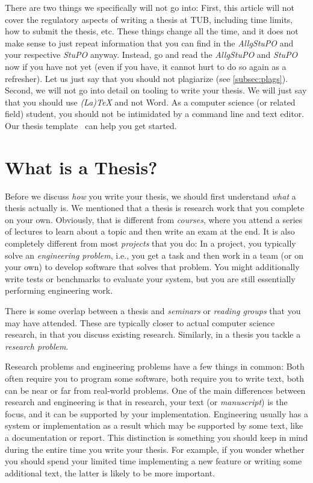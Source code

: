 \documentclass[a4paper]{article}
\begin{document}
There are two things we specifically will not go into:
First, this article will not cover the regulatory aspects of writing a thesis at TUB, including time limits, how to submit the thesis, etc.
These things change all the time, and it does not make sense to just repeat information that you can find in the \emph{AllgStuPO} and your respective \emph{StuPO} anyway.
Instead, go and read the \emph{AllgStuPO} and \emph{StuPO} now if you have not yet (even if you have, it cannot hurt to do so again as a refresher).
Let us just say that you should not plagiarize (see \cref{subsec:plags}).
Second, we will not go into detail on tooling to write your thesis.
We will just say that you should use \emph{(La)TeX} and not Word.
As a computer science (or related field) student, you should not be intimidated by a command line and text editor.
Our thesis template~\cite{thesis-template} can help you get started.

\section{What is a Thesis?}
\label{sec:what}

Before we discuss \emph{how} you write your thesis, we should first understand \emph{what} a thesis actually is.
We mentioned that a thesis is research work that you complete on your own.
Obviously, that is different from \emph{courses}, where you attend a series of lectures to learn about a topic and then write an exam at the end.
It is also completely different from most \emph{projects} that you do:
In a project, you typically solve an \emph{engineering problem}, i.e., you get a task and then work in a team (or on your own) to develop software that solves that problem.
You might additionally write tests or benchmarks to evaluate your system, but you are still essentially performing engineering work.

There is some overlap between a thesis and \emph{seminars} or \emph{reading groups} that you may have attended.
These are typically closer to actual computer science research, in that you discuss existing research.
Similarly, in a thesis you tackle a \emph{research problem}.

Research problems and engineering problems have a few things in common:
Both often require you to program some software, both require you to write text, both can be near or far from real-world problems.
One of the main differences between research and engineering is that in research, your text (or \emph{manuscript}) is the focus, and it can be supported by your implementation.
Engineering usually has a system or implementation as a result which may be supported by some text, like a documentation or report.
This distinction is something you should keep in mind during the entire time you write your thesis.
For example, if you wonder whether you should spend your limited time implementing a new feature or writing some additional text, the latter is likely to be more important.
\end{document}
